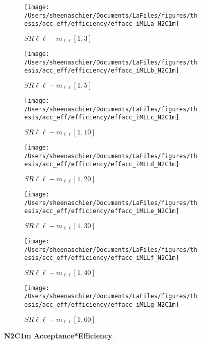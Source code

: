 \begin{figure}
        \centering
    \begin{subfigure}[b]{0.44\textwidth}
        \texttt{[image: /Users/sheenaschier/Documents/LaFiles/figures/thesis/acc\_eff/efficiency/effacc\_iMLLa\_N2C1m]}
    \caption{$SR\ell\ell-m_{\ell\ell} [1, 3]$}
    \end{subfigure}
    \begin{subfigure}[b]{0.44\textwidth}
        \texttt{[image: /Users/sheenaschier/Documents/LaFiles/figures/thesis/acc\_eff/efficiency/effacc\_iMLLb\_N2C1m]}
    \caption{$SR\ell\ell-m_{\ell\ell} [1, 5]$}
    \end{subfigure}
    \begin{subfigure}[b]{0.44\textwidth}
        \texttt{[image: /Users/sheenaschier/Documents/LaFiles/figures/thesis/acc\_eff/efficiency/effacc\_iMLLc\_N2C1m]}
    \caption{$SR\ell\ell-m_{\ell\ell} [1, 10]$}
    \end{subfigure}
    \begin{subfigure}[b]{0.44\textwidth}
        \texttt{[image: /Users/sheenaschier/Documents/LaFiles/figures/thesis/acc\_eff/efficiency/effacc\_iMLLd\_N2C1m]}
    \caption{$SR\ell\ell-m_{\ell\ell} [1, 20]$}
    \end{subfigure}
    \begin{subfigure}[b]{0.44\textwidth}
        \texttt{[image: /Users/sheenaschier/Documents/LaFiles/figures/thesis/acc\_eff/efficiency/effacc\_iMLLe\_N2C1m]}
    \caption{$SR\ell\ell-m_{\ell\ell} [1, 30]$}
    \end{subfigure}
    \begin{subfigure}[b]{0.44\textwidth}
        \texttt{[image: /Users/sheenaschier/Documents/LaFiles/figures/thesis/acc\_eff/efficiency/effacc\_iMLLf\_N2C1m]}
    \caption{$SR\ell\ell-m_{\ell\ell} [1, 40]$}
    \end{subfigure}
    \begin{subfigure}[b]{0.44\textwidth}
        \texttt{[image: /Users/sheenaschier/Documents/LaFiles/figures/thesis/acc\_eff/efficiency/effacc\_iMLLg\_N2C1m]}
    \caption{$SR\ell\ell-m_{\ell\ell} [1, 60]$}
    \end{subfigure}
    \caption{\textbf{N2C1m Acceptance*Efficiency}.}
\end{figure}


